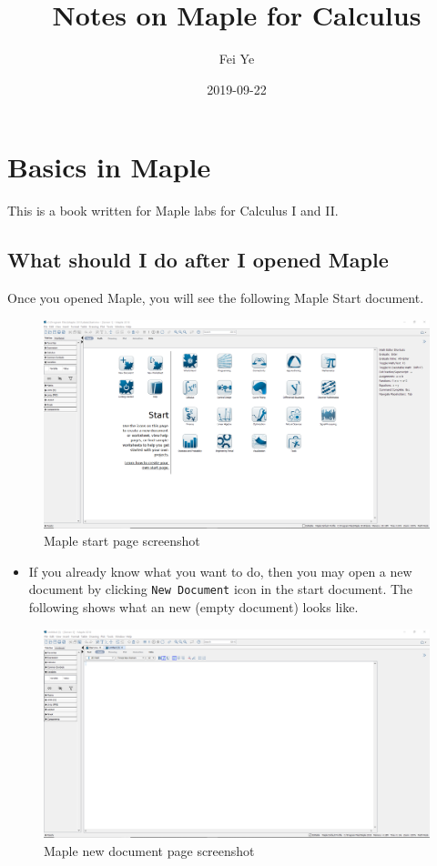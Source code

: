 \documentclass[]{book}
\title{Notes on Maple for Calculus}
\author{Fei Ye}
\date{2019-09-22}
\providecommand{\tightlist}{%
  \setlength{\itemsep}{0pt}\setlength{\parskip}{0pt}}
\theoremstyle{definition}
\theoremstyle{definition}
\theoremstyle{definition}
\theoremstyle{remark}
\begin{document}
\maketitle

{
\setcounter{tocdepth}{1}
\tableofcontents
}
\hypertarget{basics-in-maple}{%
\chapter{Basics in Maple}\label{basics-in-maple}}

This is a book written for Maple labs for Calculus I and II.

\hypertarget{what-should-i-do-after-i-opened-maple}{%
\section{What should I do after I opened Maple}\label{what-should-i-do-after-i-opened-maple}}

Once you opened Maple, you will see the following Maple Start document.

\begin{figure}
\centering
\includegraphics{figs/Maple-Start.png}
\caption{Maple start page screenshot}
\end{figure}

\begin{itemize}
\tightlist
\item
  If you already know what you want to do, then you may open a new document by clicking \texttt{New\ Document} icon in the start document. The following shows what an new (empty document) looks like.
\end{itemize}

\begin{figure}
\centering
\includegraphics{figs/Maple-New-Doc.png}
\caption{Maple new document page screenshot}
\end{figure}
\end{document}
